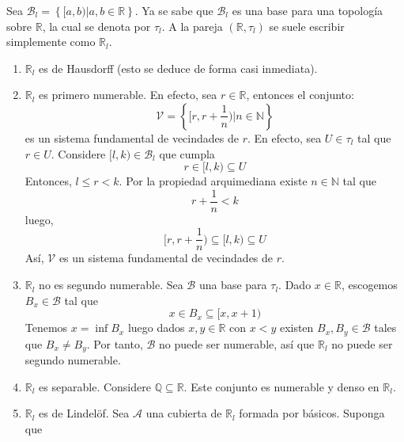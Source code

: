 \documentclass[12pt]{report}
\theoremstyle{largebreak}
\begin{document}
    \begin{exa}
        Sea $\mathcal{B}_l=\left\{[a,b)\Big|a,b\in\mathbb{R} \right\}$. Ya se sabe que $\mathcal{B}_l$ es una base para una topología sobre $\mathbb{R}$, la cual se denota por $\tau_l$. A la pareja $(\mathbb{R},\tau_l)$ se suele escribir simplemente como $\mathbb{R}_l$.
        \begin{enumerate}
            \item $\mathbb{R}_l$ es de Hausdorff (esto se deduce de forma casi inmediata).
            \item $\mathbb{R}_l$ es primero numerable. En efecto, sea $r\in\mathbb{R}$, entonces el conjunto:
            \begin{equation*}
                \mathcal{V}=\left\{[r,r+\frac{1}{n})\Big|n\in\mathbb{N} \right\}
            \end{equation*}
            es un sistema fundamental de vecindades de $r$. En efecto, sea $U\in\tau_l$ tal que $r\in U$. Considere $[l,k)\in\mathcal{B}_l$ que cumpla
            \begin{equation*}
                r\in [l,k)\subseteq U
            \end{equation*}
            Entonces, $l\leq r<k$. Por la propiedad arquimediana existe $n\in\mathbb{N}$ tal que
            \begin{equation*}
                r+\frac{1}{n}<k
            \end{equation*}
            luego,
            \begin{equation*}
                [r,r+\frac{1}{n})\subseteq [l,k)\subseteq U
            \end{equation*}
            Así, $\mathcal{V}$ es un sistema fundamental de vecindades de $r$.
            \item $\mathbb{R}_l$ no es segundo numerable. Sea $\mathcal{B}$ una base para $\tau_l$. Dado $x\in\mathbb{R}$, escogemos $B_x\in\mathcal{B}$ tal que
            \begin{equation*}
                x\in B_x\subseteq [x,x+1)
            \end{equation*}
            Tenemos $x=\inf B_x$ luego dados $x,y\in\mathbb{R}$ con $x<y$ existen $B_x,B_y\in\mathcal{B}$ tales que $B_x\neq B_y$. Por tanto, $\mathcal{B}$ no puede ser numerable, así que $\mathbb{R}_l$ no puede ser segundo numerable.
            \item $\mathbb{R}_l$ es separable. Considere $\mathbb{Q}\subseteq\mathbb{R}$. Este conjunto es numerable y denso en $\mathbb{R}_l$.
            \item $\mathbb{R}_l$ es de Lindelöf. Sea $\mathcal{A}$ una cubierta de $\mathbb{R}_l$ formada por básicos. Suponga que

\end{enumerate}
\end{exa}
\end{document}
